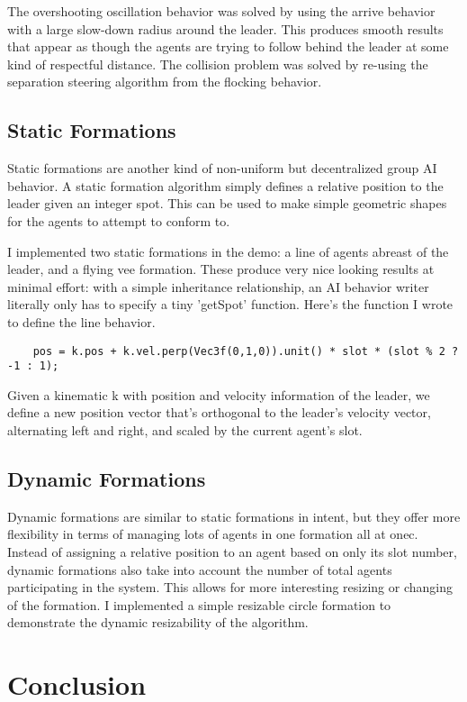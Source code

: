 \documentclass{article}
\begin{document}
The overshooting oscillation behavior was solved by using the arrive behavior
with a large slow-down radius around the leader. This produces smooth results
that appear as though the agents are trying to follow behind the leader at some
kind of respectful distance. The collision problem was solved by re-using the
separation steering algorithm from the flocking behavior.

\subsection {Static Formations}
Static formations are another kind of non-uniform but decentralized group AI
behavior. A static formation algorithm simply defines a relative position to
the leader given an integer spot. This can be used to make simple geometric
shapes for the agents to attempt to conform to.

I implemented two static formations in the demo: a line of agents abreast of
the leader, and a flying vee formation. These produce very nice looking results at minimal effort: with a simple inheritance relationship, an AI behavior writer
literally only has to specify a tiny 'getSpot' function. Here's the function I
wrote to define the line behavior.

\begin{lstlisting}
    pos = k.pos + k.vel.perp(Vec3f(0,1,0)).unit() * slot * (slot % 2 ? -1 : 1);
\end{lstlisting}
Given a kinematic k with position and velocity information of the leader, we
define a new position vector that's orthogonal to the leader's velocity vector,
alternating left and right, and scaled by the current agent's slot.

\subsection {Dynamic Formations}
Dynamic formations are similar to static formations in intent, but they offer
more flexibility in terms of managing lots of agents in one formation all at
onec. Instead of assigning a relative position to an agent based on only its
slot number, dynamic formations also take into account the number of total
agents participating in the system. This allows for more interesting resizing or
changing of the formation. I implemented a simple resizable circle formation
to demonstrate the dynamic resizability of the algorithm.

\section {Conclusion}
\end{document}
